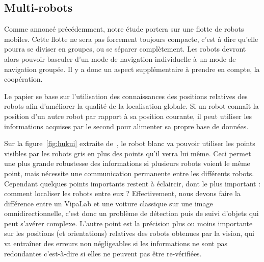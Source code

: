 \subsection{Multi-robots}

Comme annoncé précédemment, notre étude portera sur une flotte de robots mobiles.
Cette flotte ne sera pas forcement toujours compacte, c'est à dire qu'elle pourra se diviser en groupes, ou se séparer complètement.
Les robots devront alors pouvoir basculer d'un mode de navigation individuelle à un mode de navigation groupée.
Il y a donc un aspect supplémentaire à prendre en compte, la coopération.

Le papier \cite{Hukui10} se base sur l'utilisation des connaissances des positions relatives des robots afin d'améliorer la qualité de la localisation globale.
Si un robot connaît la position d'un autre robot par rapport à sa position courante, il peut utiliser les informations acquises par le second pour alimenter sa propre base de données.

Sur la figure~\ref{fig:hukui} extraite de~\cite{Hukui10}, le robot blanc va pouvoir utiliser les points visibles par les robots gris en plus des points qu'il verra lui même.
Ceci permet une plus grande robustesse des informations si plusieurs robots voient le même point, mais nécessite une communication permanente entre les différents robots.
Cependant quelques points importants restent à éclaircir, dont le plus important : comment localiser les robots entre eux ?
Effectivement, nous devons faire la différence entre un VipaLab et une voiture classique sur une image omnidirectionnelle, c'est donc un problème de détection puis de suivi d'objets qui peut s'avérer complexe.
L'autre point est la précision plus ou moins importante sur les positions (et orientations) relatives des robots obtenues par la vision, qui va entraîner des erreurs non négligeables si les informations ne sont pas redondantes c'est-à-dire si elles ne peuvent pas être re-vérifiées.


